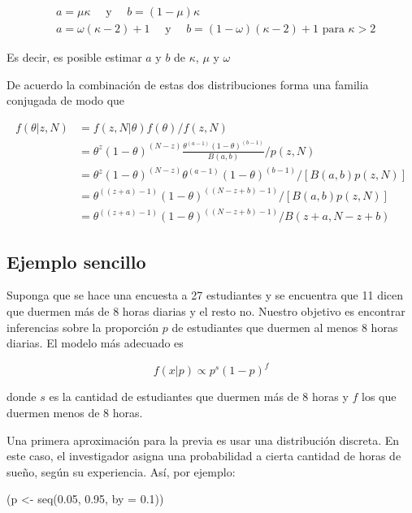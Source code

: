 \documentclass[
  12pt,
]{book}
\newenvironment{Shaded}{\begin{snugshade}}{\end{snugshade}}
\newcommand{\AttributeTok}[1]{\textcolor[rgb]{0.77,0.63,0.00}{#1}}
\newcommand{\FloatTok}[1]{\textcolor[rgb]{0.00,0.00,0.81}{#1}}
\newcommand{\FunctionTok}[1]{\textcolor[rgb]{0.00,0.00,0.00}{#1}}
\newcommand{\NormalTok}[1]{#1}
\newcommand{\OtherTok}[1]{\textcolor[rgb]{0.56,0.35,0.01}{#1}}
\theoremstyle{definition}
\theoremstyle{definition}
\theoremstyle{definition}
\theoremstyle{remark}
\begin{document}
\begin{align*}
          & a=\mu \kappa \quad \text { y } \quad b=(1-\mu) \kappa                                         \\
          & a=\omega(\kappa-2)+1 \quad \text { y } \quad b=(1-\omega)(\kappa-2)+1 \text { para } \kappa>2
\end{align*}

Es decir, es posible estimar \(a\) y \(b\) de \(\kappa\), \(\mu\) y \(\omega\)

De acuerdo la combinación de estas dos distribuciones forma una familia conjugada de modo que

\begin{align*}
        f(\theta | z, N)
          & = f(z, N | \theta) f(\theta) / f(z, N)
        \quad                                              \\
          & = \theta^{z}(1-\theta)^{(N-z)} \frac{\theta^{(a-1)}(1-\theta)^{(b-1)}}{B(a, b)} / p(z, N) \\
          & = \theta^{z}(1-\theta)^{(N-z)} \theta^{(a-1)}(1-\theta)^{(b-1)} /[B(a, b) p(z, N)]        \\
          & = \theta^{((z+a)-1)}(1-\theta)^{((N-z+b)-1)} /[B(a, b) p(z, N)]                           \\
          & = \theta^{((z+a)-1)}(1-\theta)^{((N-z+b)-1)} / B(z+a, N-z+b)
\end{align*}

\hypertarget{ejemplo-sencillo}{%
\subsection{Ejemplo sencillo}\label{ejemplo-sencillo}}

Suponga que se hace una encuesta a 27 estudiantes y se encuentra que
11 dicen que duermen más de 8 horas diarias y el resto no. Nuestro
objetivo es encontrar inferencias sobre la proporción \(p\) de
estudiantes que duermen al menos 8 horas diarias. El modelo más
adecuado es

\[
        f(x \vert p) \propto p^s (1-p)^f
\]

donde \(s\) es la cantidad de estudiantes que duermen más de 8 horas y
\(f\) los que duermen menos de 8 horas.

Una primera aproximación para la previa es usar una distribución
discreta. En este caso, el investigador asigna una probabilidad a
cierta cantidad de horas de sueño, según su experiencia. Así, por
ejemplo:

\begin{Shaded}
\begin{Highlighting}[]
\NormalTok{(p }\OtherTok{\textless{}{-}} \FunctionTok{seq}\NormalTok{(}\FloatTok{0.05}\NormalTok{, }\FloatTok{0.95}\NormalTok{, }\AttributeTok{by =} \FloatTok{0.1}\NormalTok{))}
\end{Highlighting}
\end{Shaded}
\end{document}
